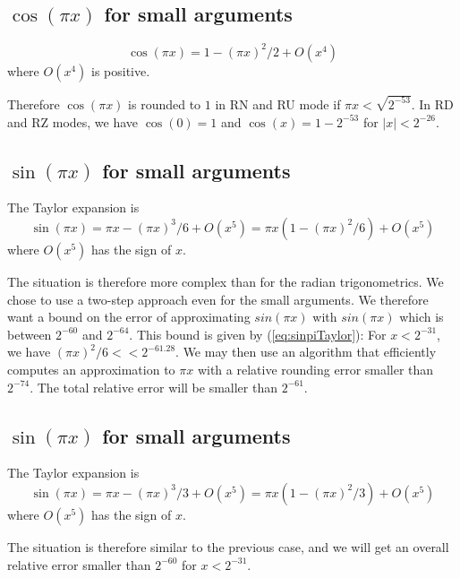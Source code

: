 



\subsection{$\cos(\pi x)$ for small arguments}


  \begin{equation}
    \cos(\pi x) = 1-(\pi x)^2/2 + O(x^4)\label{eq:cospiTaylor}
  \end{equation}
 where $O(x^4)$ is positive.

  Therefore $\cos(\pi x)$ is rounded to $1$ in RN and RU mode if
  $\pi x<\sqrt{2^{-53}}$. In RD and RZ modes, we have $\cos(0)=1$ and
  $\cos(x)=1-2^{-53}$ for $|x|<2^{-26}$.




\subsection{$\sin(\pi x)$ for small arguments}
The Taylor expansion is
\begin{equation}
  \sin(\pi x) = \pi x - (\pi x)^3/6 + O(x^5) = \pi x(1-(\pi
  x)^2/6) + O(x^5)\label{eq:sinpiTaylor}
\end{equation}
  where $O(x^5)$ has the sign of $x$. 

The situation is therefore more complex than for the radian
trigonometrics. We chose to use a two-step approach even for the small
arguments.  We therefore want a bound on the error of approximating
$sin(\pi x)$ with $sin(\pi x)$ which is between $2^{-60}$ and
$2^{-64}$.  This bound is given by (\ref{eq:sinpiTaylor}): For
$x<2^{-31}$, we have $(\pi x)^2/6 <<2^{-61.28}$.  We may then use an
algorithm that efficiently computes an approximation to $\pi x$ with a
relative rounding error smaller than $2^{-74}$. The total relative
error will be smaller than $2^{-61}$.


\subsection{$\sin(\pi x)$ for small arguments}
The Taylor expansion is
\begin{equation}
  \sin(\pi x) = \pi x - (\pi x)^3/3 + O(x^5) = \pi x(1-(\pi
  x)^2/3) + O(x^5)\label{eq:tanpiTaylor}
\end{equation}
where $O(x^5)$ has the sign of $x$.

The situation is therefore similar to the previous case, and we will get an
overall relative error smaller than $2^{-60}$ for $x<2^{-31}$.


